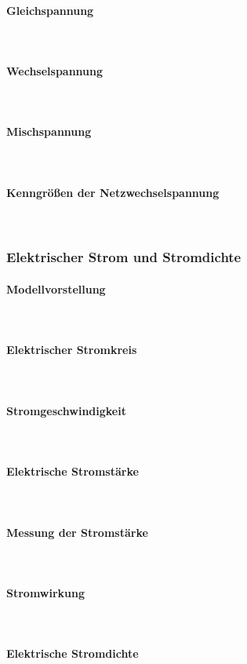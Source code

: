 		\paragraph{Gleichspannung}~\\
		\paragraph{Wechselspannung}~\\
		\paragraph{Mischspannung}~\\
		\paragraph{Kenngrößen der Netzwechselspannung}~\\
	\subsubsection{Elektrischer Strom und Stromdichte}
		\paragraph{Modellvorstellung}~\\
		\paragraph{Elektrischer Stromkreis}~\\
		\paragraph{Stromgeschwindigkeit}~\\
		\paragraph{Elektrische Stromstärke}~\\
		\paragraph{Messung der Stromstärke}~\\
		\paragraph{Stromwirkung}~\\
		\paragraph{Elektrische Stromdichte}~\\
